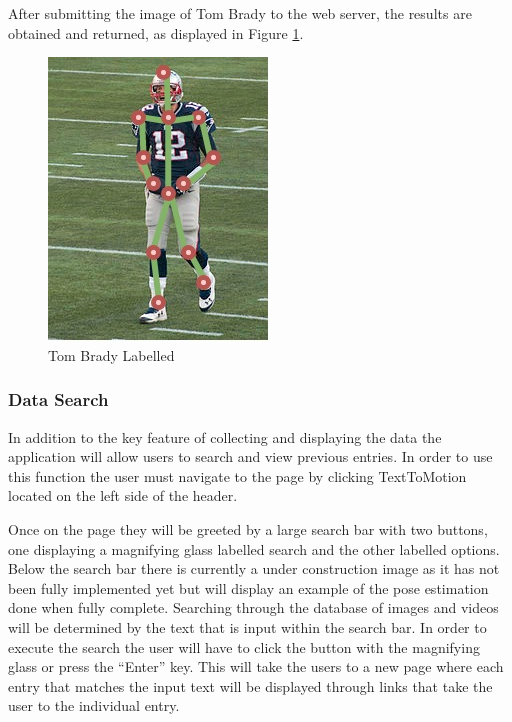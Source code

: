 \documentclass{scrreprt}
\begin{document}
After submitting the image of Tom Brady to the web server, the results are
obtained and returned, as displayed in Figure \ref{fig:labelledBrady}.

\begin{figure}
        \includegraphics[width=\linewidth]{tbradylabelled.jpg}
  \caption{Tom Brady Labelled}
  \label{fig:labelledBrady}
\end{figure}

\FloatBarrier

\subsubsection{Data Search}

In addition to the key feature of collecting and displaying the data the
application will allow users to search and view previous entries. In order to
use this function the user must navigate to the page by clicking TextToMotion
located on the left side of the header.

Once on the page they will be greeted by a large search bar with two buttons,
one displaying a magnifying glass labelled search and the other labelled
options. Below the search bar there is currently a under construction image as
it has not been fully implemented yet but will display an example of the pose
estimation done when fully complete. Searching through the database of images
and videos will be determined by the text that is input within the search bar.
In order to execute the search the user will have to click the button with the
magnifying glass or press the ``Enter'' key. This will take the users to a new
page where each entry that matches the input text will be displayed through
links that take the user to the individual entry.
\end{document}
